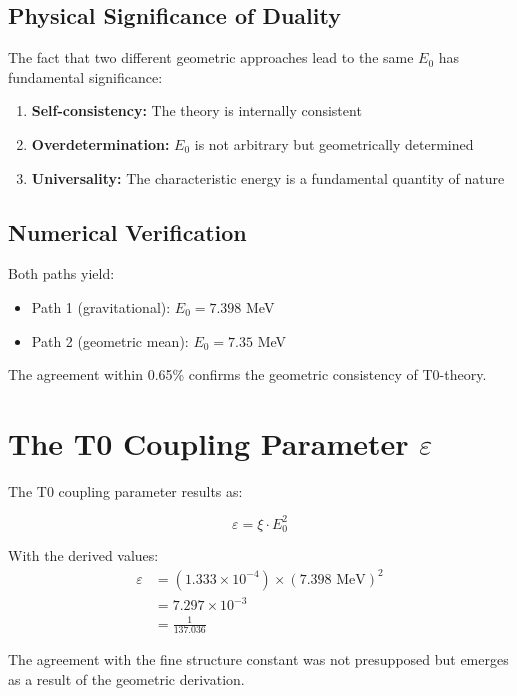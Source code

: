 	\subsection{Physical Significance of Duality}
	
	The fact that two different geometric approaches lead to the same $E_0$ has fundamental significance:
	
	\begin{enumerate}
		\item \textbf{Self-consistency:} The theory is internally consistent
		\item \textbf{Overdetermination:} $E_0$ is not arbitrary but geometrically determined
		\item \textbf{Universality:} The characteristic energy is a fundamental quantity of nature
	\end{enumerate}
	
	\subsection{Numerical Verification}
	
	Both paths yield:
	\begin{itemize}
		\item Path 1 (gravitational): $E_0 = 7.398$ MeV
		\item Path 2 (geometric mean): $E_0 = 7.35$ MeV
	\end{itemize}
	
	The agreement within 0.65\% confirms the geometric consistency of T0-theory.
	
	\section{The T0 Coupling Parameter $\varepsilon$}
	
	The T0 coupling parameter results as:
	
	\begin{equation}
		\varepsilon = \xi \cdot E_0^2
	\end{equation}
	
	With the derived values:
	\begin{align}
		\varepsilon &= (1.333 \times 10^{-4}) \times (7.398 \text{ MeV})^2\\
		&= 7.297 \times 10^{-3}\\
		&= \frac{1}{137.036}
	\end{align}
	
	The agreement with the fine structure constant was not presupposed but emerges as a result of the geometric derivation.
